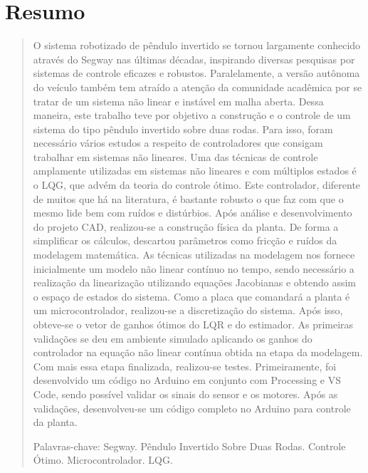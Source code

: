\newpage

\chapter*{Resumo}

\vspace*{0.5cm}

\begin{quotation}
\noindent 
O sistema robotizado de pêndulo invertido se tornou largamente conhecido através do Segway nas últimas décadas, inspirando diversas pesquisas por sistemas de controle eficazes e robustos. Paralelamente, a versão autônoma do veículo também tem atraído a atenção da comunidade acadêmica por se tratar de um sistema não linear e instável em malha aberta. Dessa maneira, este trabalho teve por objetivo a construção e o controle de um sistema do tipo pêndulo invertido sobre duas rodas. Para isso, foram necessário vários estudos a respeito de controladores que consigam trabalhar em sistemas não lineares. Uma das técnicas de controle amplamente utilizadas em sistemas não lineares e com múltiplos estados é o LQG, que advém da teoria do controle ótimo. Este controlador, diferente de muitos que há na literatura, é bastante robusto o que faz com que o mesmo lide bem com ruídos e distúrbios. Após análise e desenvolvimento do projeto CAD, realizou-se a construção física da planta. De forma a simplificar os cálculos, descartou parâmetros como fricção e ruídos da modelagem matemática. As técnicas utilizadas na modelagem nos fornece inicialmente um modelo não linear contínuo no tempo, sendo necessário a realização da linearização utilizando equações Jacobianas e obtendo assim o espaço de estados do sistema. Como a placa que comandará a planta é um microcontrolador, realizou-se a discretização do sistema. Após isso, obteve-se o vetor de ganhos ótimos do LQR e do estimador. As primeiras validações se deu em ambiente simulado aplicando os ganhos do controlador na equação não linear contínua obtida na etapa da modelagem. Com mais essa etapa finalizada, realizou-se testes. Primeiramente, foi desenvolvido um código no Arduino em conjunto com Processing e VS Code, sendo possível validar os sinais do sensor e os motores. Após as validações, desenvolveu-se um código completo no Arduino para controle da planta.
\vspace*{0.5cm}

\noindent Palavras-chave: Segway. Pêndulo Invertido Sobre Duas Rodas. Controle Ótimo. Microcontrolador. LQG.

\end{quotation}



